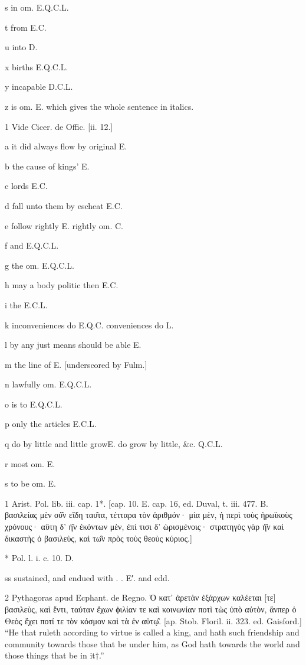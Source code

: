 s
in om. E.Q.C.L.

t
from E.C.

u
into D.

x
births E.Q.C.L.

y
incapable D.C.L.

z
is om. E. which gives the whole sentence in italics.

1
Vide Cicer. de Offic. [ii. 12.]

a
it did always flow by original E.

b
the cause of kings’ E.

c
lords E.C.

d
fall unto them by escheat E.C.

e
follow rightly E. rightly om. C.

f
and E.Q.C.L.

g
the om. E.Q.C.L.

h
may a body politic then E.C.

i
the E.C.L.

k
inconveniences do E.Q.C. conveniences do L.

l
by any just means should be able E.

m
the line of E. [underscored by Fulm.]

n
lawfully om. E.Q.C.L.

o
is to E.Q.C.L.

p
only the articles E.C.L.

q
do by little and little growE. do grow by little, &c. Q.C.L.

r
most om. E.

s
to be om. E.

1
Arist. Pol. lib. iii. cap. 1*. [cap. 10. E. cap. 16, ed. Duval, t. iii. 477. B. βασιλείας μὲν οὐ̑ν εἴδη ταυ̑τα, τέτταρα τὸν ἀριθμόν· μία μὲν, ἡ περὶ τοὺς ἡρωϊκοὺς χρόνους· αὕτη δ’ ἠ̑ν έκόντων μὲν, ἐπί τισι δ’ ὡρισμένοις· στρατηγὸς γὰρ ἠ̑ν καὶ δικαστὴς ὁ βασιλεὺς, καὶ τω̑ν πρὸς τοὺς θεοὺς κύριος.]

*
Pol. l. i. c. 10. D.

ss
sustained, and endued with . . E′. and edd.

2
Pythagoras apud Ecphant. de Regno. Ὁ κατ’ ἀρετὰν ἐξάρχων καλέεται [τε] βασιλεὺς, καὶ ἔντι, ταύταν ἔχων ϕιλίαν τε καὶ κοινωνίαν ποτὶ τὼς ὑπὸ αὐτὸν, ἅνπερ ὁ Θεὸς ἔχει ποτί τε τὸν κόσμον καὶ τὰ ἐν αὐτῳ̑. [ap. Stob. Floril. ii. 323. ed. Gaisford.] “He that ruleth according to virtue is called a king, and hath such friendship and community towards those that be under him, as God hath towards the world and those things that be in it†.”

